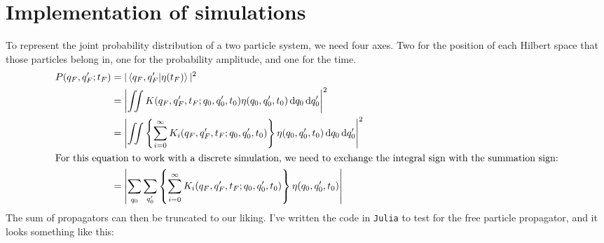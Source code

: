 \chapter{Implementation of simulations}
\label{sec:implementation_of_simulation}

To represent the joint probability distribution of a two particle system, we need four axes. Two for the position of each Hilbert space that those particles belong in, one for the probability amplitude, and one for the time.
\begin{align}
    P(q_F, q_F'; t_F) &= |\braket{q_F, q_F'}{\eta(t_F)}|^2 \\
    &= \left|\iint K(q_F, q_F', t_F; q_0, q_0', t_0)\eta(q_0, q_0', t_0)\dd{q_0}\dd{q_0'}\right|^2 \\
    &= \left|\iint \left\{\sum_{i = 0}^{\infty}K_i(q_F, q_F', t_F; q_0, q_0', t_0)\right\}\eta(q_0, q_0', t_0)\dd{q_0}\dd{q_0'}\right|^2 \\
    \intertext{For this equation to work with a discrete simulation, we need to exchange the integral sign with the summation sign:}
    &= \left|\sum_{\vphantom{q_0'}q_0}\sum_{q_0'}\left\{\sum_{\vphantom{q_0'}i = 0}^{\infty}K_i(q_F, q_F', t_F; q_0, q_0', t_0)\right\}\eta(q_0, q_0', t_0)\right|
\end{align}
The sum of propagators can then be truncated to our liking. I've written the code in \texttt{Julia} to test for the free particle propagator, and it looks something like this:

